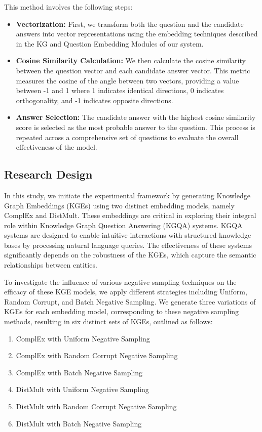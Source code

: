 \documentclass[12pt]{article}
\begin{document}
This method involves the following steps:

\begin{itemize}
    \item \textbf{Vectorization:} First, we transform both the question and the candidate answers into vector representations using the embedding techniques described in the KG and Question Embedding Modules of our system.
    \item \textbf{Cosine Similarity Calculation:} We then calculate the cosine similarity between the question vector and each candidate answer vector. This metric measures the cosine of the angle between two vectors, providing a value between -1 and 1 where 1 indicates identical directions, 0 indicates orthogonality, and -1 indicates opposite directions.
    \item \textbf{Answer Selection:} The candidate answer with the highest cosine similarity score is selected as the most probable answer to the question. This process is repeated across a comprehensive set of questions to evaluate the overall effectiveness of the model.
\end{itemize}

\subsection{Research Design}

In this study, we initiate the experimental framework by generating Knowledge Graph Embeddings (KGEs) using two distinct embedding models, namely ComplEx and DistMult. These embeddings are critical in exploring their integral role within Knowledge Graph Question Answering (KGQA) systems. KGQA systems are designed to enable intuitive interactions with structured knowledge bases by processing natural language queries. The effectiveness of these systems significantly depends on the robustness of the KGEs, which capture the semantic relationships between entities.

To investigate the influence of various negative sampling techniques on the efficacy of these KGE models, we apply different strategies including Uniform, Random Corrupt, and Batch Negative Sampling. We generate three variations of KGEs for each embedding model, corresponding to these negative sampling methods, resulting in six distinct sets of KGEs, outlined as follows:

\begin{enumerate}
\item ComplEx with Uniform Negative Sampling
\item ComplEx with Random Corrupt Negative Sampling
\item ComplEx with Batch Negative Sampling
\item DistMult with Uniform Negative Sampling
\item DistMult with Random Corrupt Negative Sampling
\item DistMult with Batch Negative Sampling
\end{enumerate}
\end{document}
